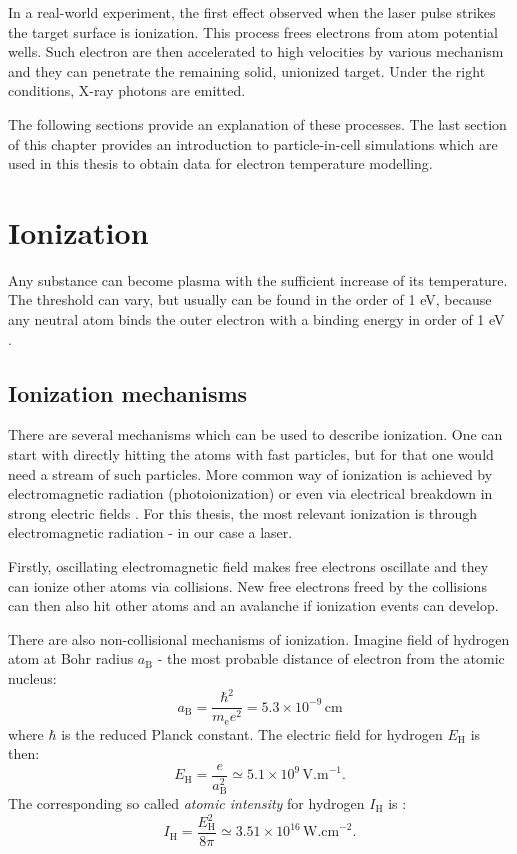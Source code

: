 In a real-world experiment, the first effect observed when the laser pulse strikes the target surface is ionization. This process frees electrons from atom potential wells. Such electron are then accelerated to high velocities by various mechanism and they can penetrate the remaining solid, unionized target. Under the right conditions, X-ray photons are emitted.

The following sections provide an explanation of these processes. The last section of this chapter provides an introduction to particle-in-cell simulations which are used in this thesis to obtain data for electron temperature modelling.

\section{Ionization}
Any substance can become plasma with the sufficient increase of its temperature. The threshold can vary, but usually can be found in the order of 1 eV, because any neutral atom binds the outer electron with a binding energy in order of 1 eV \cite{laser-plasma1}. 

\subsection*{Ionization mechanisms}
There are several mechanisms which can be used to describe ionization. One can start with directly hitting the atoms with fast particles, but for that one would need a stream of such particles. More common way of ionization is achieved by electromagnetic radiation (photoionization) or even via electrical breakdown in strong electric fields \cite{plasma-intro}. For this thesis, the most relevant ionization is through electromagnetic radiation - in our case a laser.

Firstly, oscillating electromagnetic field makes free electrons oscillate and they can ionize other atoms via collisions. New free electrons freed by the collisions can then also hit other atoms and an avalanche if ionization events can develop.

There are also non-collisional mechanisms of ionization. Imagine field of hydrogen atom at Bohr radius $a_\mathrm{B}$ - the most probable distance of electron from the atomic nucleus:
\begin{equation}
	a_\mathrm{B} = \frac{\hbar^2}{m_\mathrm{e}e^2} = 5.3 \times 10^{-9} \, \mathrm{ cm}
\end{equation}
\noindent where $\hbar$ is the reduced Planck constant.
The electric field for hydrogen $E_{\mathrm{H}}$ is then:
\begin{equation}
	E_{\mathrm{H}} = \frac{e}{a_\mathrm{B}^2} \simeq 5.1 \times 10^{9} \, \mathrm{V.m}^{-1}.
\end{equation}
\noindent The corresponding so called \textit{atomic intensity} for hydrogen $I_{\mathrm{H}}$ is \cite{plasma-intro}:
\begin{equation}
	I_{\mathrm{H}} = \frac{E_{\mathrm{H}}^2}{8\pi} \simeq 3.51 \times 10^{16} \, \mathrm{W.cm}^{-2}.
\end{equation}

